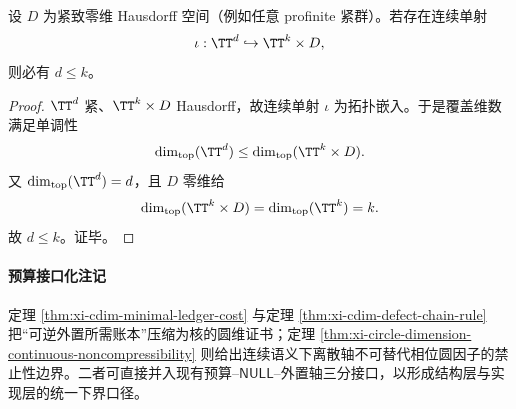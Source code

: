 \begin{theorem}[连续语义下的圆维不可压缩]\label{thm:xi-circle-dimension-continuous-noncompressibility}
设 \(D\) 为紧致零维 Hausdorff 空间（例如任意 profinite 紧群）。若存在连续单射
\[
\iota:\TT^d\hookrightarrow \TT^k\times D,
\]
则必有 \(d\le k\)。
\end{theorem}
\begin{proof}
\(\TT^d\) 紧、\(\TT^k\times D\) Hausdorff，故连续单射 \(\iota\) 为拓扑嵌入。于是覆盖维数满足单调性
\[
\dim_{\mathrm{top}}(\TT^d)\le \dim_{\mathrm{top}}(\TT^k\times D).
\]
又 \(\dim_{\mathrm{top}}(\TT^d)=d\)，且 \(D\) 零维给
\[
\dim_{\mathrm{top}}(\TT^k\times D)=\dim_{\mathrm{top}}(\TT^k)=k.
\]
故 \(d\le k\)。证毕。
\end{proof}

\paragraph{预算接口化注记}
定理 \ref{thm:xi-cdim-minimal-ledger-cost} 与定理 \ref{thm:xi-cdim-defect-chain-rule} 把“可逆外置所需账本”压缩为核的圆维证书；定理 \ref{thm:xi-circle-dimension-continuous-noncompressibility} 则给出连续语义下离散轴不可替代相位圆因子的禁止性边界。二者可直接并入现有预算--\(\mathsf{NULL}\)--外置轴三分接口，以形成结构层与实现层的统一下界口径。
